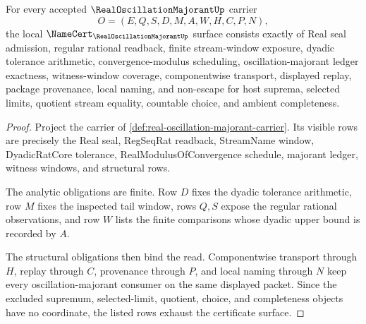 \begin{theorem}
\label{thm:real-oscillation-majorant-namecert-obligations}
For every accepted $\RealOscillationMajorantUp$ carrier
$$
O=(E,Q,S,D,M,A,W,H,C,P,N),
$$
the local $\NameCert_{\RealOscillationMajorantUp}$ surface consists exactly of Real seal admission, regular rational readback, finite stream-window exposure, dyadic tolerance arithmetic, convergence-modulus scheduling, oscillation-majorant ledger exactness, witness-window coverage, componentwise transport, displayed replay, package provenance, local naming, and non-escape for host suprema, selected limits, quotient stream equality, countable choice, and ambient completeness.
\end{theorem}
\begin{proof}
Project the carrier of \autoref{def:real-oscillation-majorant-carrier}. Its visible rows are precisely the Real seal, RegSeqRat readback, StreamName window, DyadicRatCore tolerance, RealModulusOfConvergence schedule, majorant ledger, witness windows, and structural rows.

The analytic obligations are finite. Row $D$ fixes the dyadic tolerance arithmetic, row $M$ fixes the inspected tail window, rows $Q,S$ expose the regular rational observations, and row $W$ lists the finite comparisons whose dyadic upper bound is recorded by $A$.

The structural obligations then bind the read. Componentwise transport through $H$, replay through $C$, provenance through $P$, and local naming through $N$ keep every oscillation-majorant consumer on the same displayed packet. Since the excluded supremum, selected-limit, quotient, choice, and completeness objects have no coordinate, the listed rows exhaust the certificate surface.
\end{proof}

